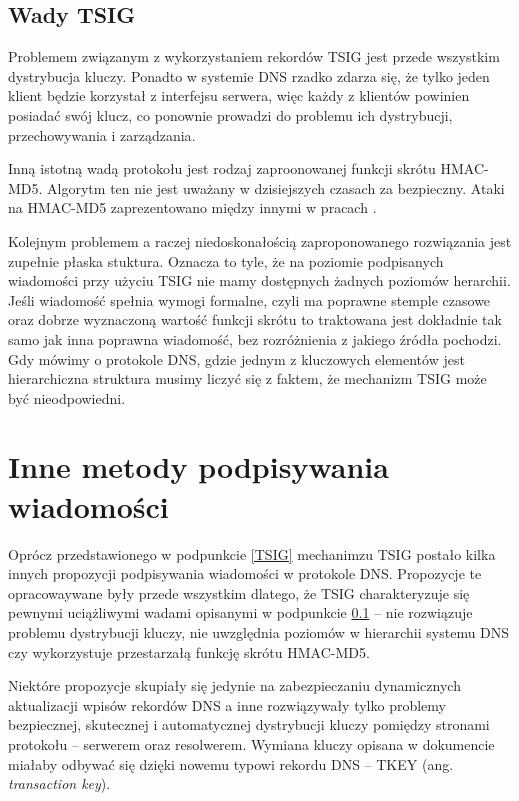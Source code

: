 \subsection{Wady TSIG}\label{wady-tsig}
Problemem związanym z wykorzystaniem rekordów TSIG jest przede wszystkim dystrybucja kluczy. Ponadto w systemie DNS rzadko zdarza się, że tylko jeden klient będzie korzystał z interfejsu serwera, więc każdy z klientów powinien posiadać swój klucz, co ponownie prowadzi do problemu ich dystrybucji, przechowywania i zarządzania\cite{nask-tsig}. 

Inną istotną wadą protokołu jest rodzaj zaproonowanej funkcji skrótu HMAC-MD5. Algorytm ten nie jest uważany w dzisiejszych czasach za bezpieczny. Ataki na HMAC-MD5 zaprezentowano między innymi w pracach \cite{hmac-md5-attack, hmac-md5-cryptoanalisys}. 

Kolejnym problemem a raczej niedoskonałością zaproponowanego rozwiązania jest zupełnie płaska stuktura. Oznacza to tyle, że na poziomie podpisanych wiadomości przy użyciu TSIG nie mamy dostępnych żadnych poziomów herarchii. Jeśli wiadomość spełnia wymogi formalne, czyli ma poprawne stemple czasowe oraz dobrze wyznaczoną wartość funkcji skrótu to traktowana jest dokładnie tak samo jak inna poprawna wiadomość, bez rozróżnienia z jakiego źródła pochodzi. Gdy mówimy o protokole DNS, gdzie jednym z kluczowych elementów jest hierarchiczna struktura musimy liczyć się z faktem, że mechanizm TSIG może być nieodpowiedni.

\section{Inne metody podpisywania wiadomości}
Oprócz przedstawionego w podpunkcie \ref{TSIG} mechanimzu TSIG postało kilka innych propozycji podpisywania wiadomości w protokole DNS. Propozycje te opracowaywane były przede wszystkim dlatego, że TSIG charakteryzuje się pewnymi uciążliwymi wadami opisanymi w podpunkcie \ref{wady-tsig} -- nie rozwiązuje problemu dystrybucji kluczy, nie uwzględnia poziomów w hierarchii systemu DNS czy wykorzystuje przestarzałą funkcję skrótu HMAC-MD5.

Niektóre propozycje skupiały się jedynie na zabezpieczaniu dynamicznych aktualizacji wpisów rekordów DNS \cite{RFC2137} a inne rozwiązywały tylko problemy bezpiecznej, skutecznej i automatycznej dystrybucji kluczy pomiędzy stronami protokołu -- serwerem oraz resolwerem\cite{RFC2930}. Wymiana kluczy opisana w dokumencie \cite{RFC2930} miałaby odbywać się dzięki nowemu typowi rekordu DNS -- TKEY (ang. \textit{transaction key}).

